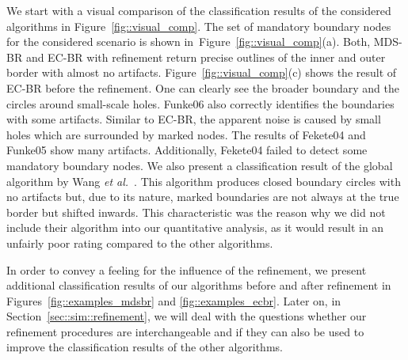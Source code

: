 \documentclass{llncs}
\begin{document}
We start with a visual comparison of the classification results of the considered algorithms in Figure~\ref{fig::visual_comp}.
The set of mandatory boundary nodes for the considered scenario is shown in~Figure~\ref{fig::visual_comp}(a).
Both, MDS-BR and EC-BR with refinement return precise outlines of the inner and outer border with almost no artifacts.
Figure~\ref{fig::visual_comp}(c) shows the result of EC-BR before the refinement.
One can clearly see the broader boundary and the circles around small-scale holes.
Funke06 also correctly identifies the boundaries with some artifacts.
Similar to EC-BR, the apparent noise is caused by small holes which are surrounded by marked nodes.
The results of Fekete04 and Funke05 show many artifacts.
Additionally, Fekete04 failed to detect some mandatory boundary nodes.
We also present a classification result of the global algorithm by Wang \emph{et al.}~\cite{wgm06}.
This algorithm produces closed boundary circles with no artifacts but, due to its nature, marked boundaries are not always at the true border but shifted inwards.
This characteristic was the reason why we did not include their algorithm into our quantitative analysis, as it would result in an unfairly poor rating compared to the other algorithms.

In order to convey a feeling for the influence of the refinement, we present additional classification results of our algorithms before and after refinement in Figures~\ref{fig::examples_mdsbr} and \ref{fig::examples_ecbr}. Later on, in Section~\ref{sec::sim::refinement}, we will deal with the questions whether our refinement procedures are interchangeable and if they can also be used to improve the classification results of the other algorithms.
\end{document}
